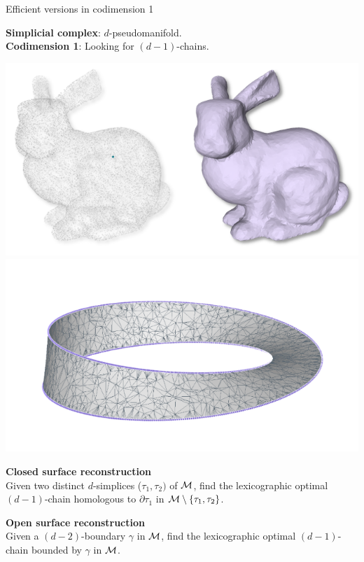 \begin{frame}{Efficient versions in codimension 1}
\scriptsize

\textbf{Simplicial complex}: \M $d$-pseudomanifold.\\
\textbf{Codimension 1}: Looking for $(d-1)$-chains.
\vspace{0.2cm}

\pause

\includegraphics[width=0.47\linewidth]{applications/bunny}%
\hfill
\includegraphics[width=0.47\linewidth]{applications/mobius}
\vspace{0.2cm}

\begin{minipage}{0.47\linewidth}
\textbf{Closed surface reconstruction}\\
Given two distinct $d$-simplices ($\tau_1, \tau_2)$ of $\mathcal{M}$, find the lexicographic optimal $(d-1)$-chain homologous to $\partial\tau_1$ in $\mathcal{M} \setminus \{ \tau_1, \tau_2 \}$.
\end{minipage}%
\hfill
\begin{minipage}{0.47\linewidth}
\textbf{Open surface reconstruction}\\
Given a $(d-2)$-boundary $\gamma$ in $\mathcal{M}$, find the lexicographic optimal $(d-1)$-chain bounded by $\gamma$ in $\mathcal{M}$.
\end{minipage}
\end{frame}

